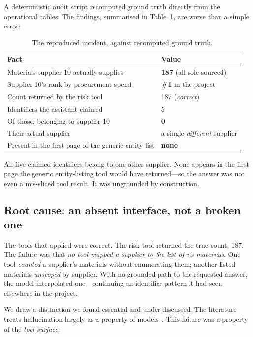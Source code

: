 \documentclass[conference]{IEEEtran}
\begin{document}
A deterministic audit script recomputed ground truth directly from the
operational tables. The findings, summarised in Table~\ref{tab:incident}, are
worse than a simple error:

\begin{table}[t]
\caption{The reproduced incident, against recomputed ground truth.}
\label{tab:incident}
\centering
\footnotesize
\begin{tabular}{@{}lp{4.6cm}@{}}
\toprule
\textbf{Fact} & \textbf{Value} \\
\midrule
Materials supplier 10 actually supplies & \textbf{187} (all sole-sourced) \\
Supplier 10's rank by procurement spend & \textbf{\#1} in the project \\
Count returned by the risk tool         & 187 (\emph{correct}) \\
Identifiers the assistant claimed       & 5 \\
Of those, belonging to supplier 10      & \textbf{0} \\
Their actual supplier                   & a single \emph{different} supplier \\
Present in the first page of the generic entity list & \textbf{none} \\
\bottomrule
\end{tabular}
\end{table}

All five claimed identifiers belong to one other supplier. None appears in the
first page the generic entity-listing tool would have returned---so the answer
was not even a mis-sliced tool result. It was ungrounded by construction.

\subsection{Root cause: an absent interface, not a broken one}

The tools that applied were correct. The risk tool returned the true count, 187.
The failure was that \emph{no tool mapped a supplier to the list of its
materials}. One tool \emph{counted} a supplier's materials without enumerating
them; another listed materials \emph{unscoped} by supplier. With no grounded path
to the requested answer, the model interpolated one---continuing an identifier
pattern it had seen elsewhere in the project.

We draw a distinction we found essential and under-discussed. The literature
treats hallucination largely as a property of models~\cite{ji2023hallucination}.
This failure was a property of the \emph{tool surface}:
\end{document}
